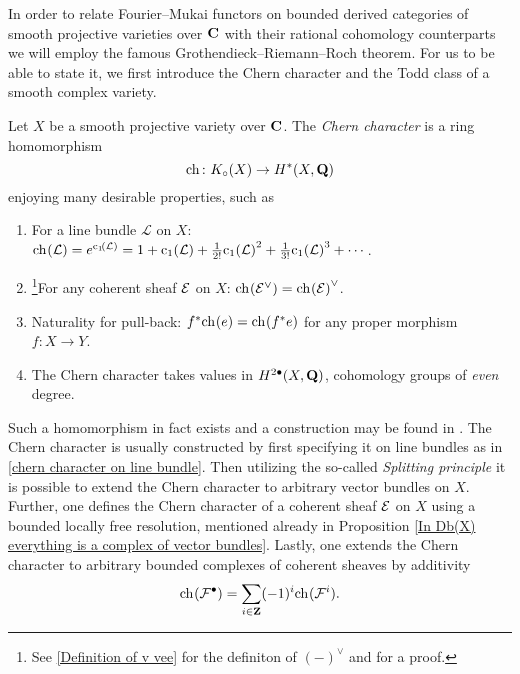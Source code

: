 In order to relate Fourier--Mukai functors on bounded derived categories of smooth projective varieties over $\mathbf C$ with their rational cohomology counterparts we will employ the famous Grothendieck--Riemann--Roch theorem. For us to be able to state it, we first introduce the Chern character and the Todd class of a smooth complex variety.

\begin{definition}
    \label{Definition of Chern character}
    Let $X$ be a smooth projective variety over $\mathbf C$. The \emph{Chern character} is a ring homomorphism
    \[
        \ch[] \colon \kgroup{X} \to \cohom{*}{X}{\Q}
    \] 
    enjoying many desirable properties, such as
    \begin{enumerate}[label = (\roman*)]
        \item{For a line bundle $\mathcal L$ on $X$: $\ch[](\mathcal L) = e^{\cclass[1]{\mathcal L}} = 1 + \cclass[1]{\mathcal L} + \frac{1}{2!}\cclass[1]{\mathcal L}^2 + \frac{1}{3!}\cclass[1]{\mathcal L}^3 + \cdots$.
        } \label{chern character on line bundle}
        \item{\footnote{
            See \ref{Definition of v vee} for the definiton of $(-)^\vee$ and \cite[Lemma C.7]{vanBree2020} for a proof.
        }For any coherent sheaf $\mathcal E$ on $X$: $\ch[]{\E^\vee} = \ch[]{\E}^\vee$.}
        \item{Naturality for pull-back: $f^*\ch[]{e} = \ch[]{f^*e}$ for any proper morphism $f \colon X \to Y$.}
        \item{The Chern character takes values in $H^{2\bullet}(X, \mathbf Q)$, \ie cohomology groups of \emph{even} degree.}
    \end{enumerate} 
\end{definition}

\begin{remark}
    Such a homomorphism in fact exists and a construction may be found in \cite[\S 3.2]{Fulton1998}. The Chern character is usually constructed by first specifying it on line bundles as in \ref{chern character on line bundle}. Then utilizing the so-called \emph{Splitting principle} \cite[\S 3.2, Remark 3.2.3]{Fulton1998} it is possible to extend the Chern character to arbitrary vector bundles on $X$. Further, one defines the Chern character of a coherent sheaf $\mathcal E$ on $X$ using a bounded locally free resolution, mentioned already in Proposition \ref{In Db(X) everything is a complex of vector bundles}. Lastly, one extends the Chern character to arbitrary bounded complexes of coherent sheaves by additivity \ie
    \[
        \ch[](\F^\bullet) = \sum_{i \in \Z}(-1)^i\ch[](\F^i).
    \] 
\end{remark}

